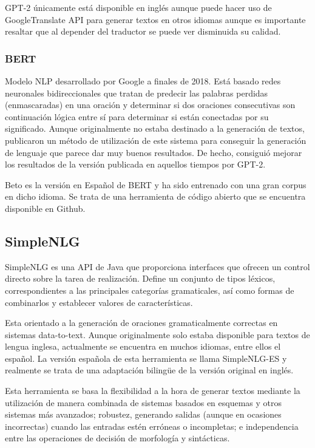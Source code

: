 GPT-2 únicamente está disponible en inglés aunque puede hacer uso de GoogleTranslate API para generar textos en otros idiomas aunque es importante resaltar que al depender del traductor se puede ver disminuida su calidad.

\subsubsection{BERT}
Modelo NLP desarrollado por Google a finales de 2018. Está basado redes neuronales bidireccionales que tratan de predecir las palabras perdidas (enmascaradas) en una oración y determinar si dos oraciones consecutivas son continuación lógica entre sí para determinar si están conectadas por su significado. Aunque originalmente no estaba destinado a la generación de textos, \cite{wang-cho-2019-bert} publicaron un método de utilización de este sistema para conseguir la generación de lenguaje que parece dar muy buenos resultados. De hecho, consiguió mejorar los resultados de la versión publicada en aquellos tiempos por GPT-2. 

Beto es la versión en Español de BERT \citep{CaneteCFP2020} y ha sido entrenado con una gran corpus en dicho idioma. Se trata de una herramienta de código abierto que se encuentra disponible en Github.




\subsection{SimpleNLG}
SimpleNLG es una API de Java que proporciona interfaces que ofrecen un control directo sobre la tarea de realización. Define un conjunto de tipos léxicos, correspondientes a las principales categorías gramaticales, así como formas de combinarlos y establecer valores de características. 

Esta orientado a la generación de oraciones gramaticalmente correctas en sistemas data-to-text. Aunque originalmente solo estaba disponible para textos de lengua inglesa, actualmente se encuentra en muchos idiomas, entre ellos el español. La versión española de esta herramienta se llama SimpleNLG-ES y realmente se trata de una adaptación bilingüe de la versión original en inglés.

Esta herramienta se basa la flexibilidad a la hora de generar textos mediante la utilización de manera combinada de sistemas basados en esquemas y otros sistemas más avanzados; robustez, generando salidas (aunque en ocasiones incorrectas) cuando las entradas estén erróneas o incompletas; e independencia entre las operaciones de decisión de morfología y sintácticas.

